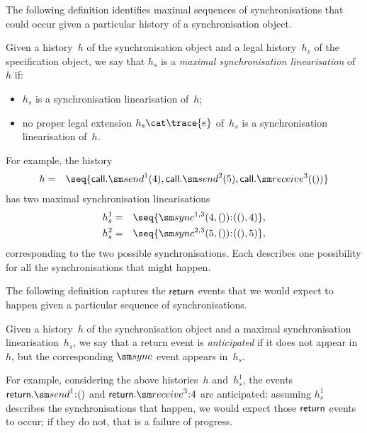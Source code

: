 
The following definition identifies maximal sequences of synchronisations
that could occur given a particular history of a synchronisation object.
%
\begin{definition}
Given a history~$h$ of the synchronisation object and a legal history~$h_s$ of
the specification object, we say that $h_s$ is a \emph{maximal synchronisation
  linearisation} of~$h$ if:
\begin{itemize}
\item $h_s$ is a synchronisation linearisation of~$h$;

\item no proper legal extension $h_s \cat \trace{e}$ of~$h_s$ is a
  synchronisation linearisation of~$h$.
\end{itemize}
\end{definition}
%
For example, the history 
\begin{eqnarray*}
h & = &\seq{\call.\send^1(4), \call.\send^2(5), \call.\receive^3(())}
\end{eqnarray*}
has two maximal synchronisation linearisations
\begin{eqnarray*}
h_s^1 & = &  \seq{\sync^{1,3}(4,())\::((),4)}, \\
h_s^2 & = & \seq{\sync^{2,3}(5,())\::((),5)},
\end{eqnarray*}
corresponding to the two possible synchronisations.  Each describes one
possibility for all the synchronisations that might happen. 


The following definition captures the $\mathsf{return}$ events that we would expect to
happen given a particular sequence of synchronisations.
%
\begin{definition}
Given a history~$h$ of the synchronisation object and a maximal
synchronisation linearisation~$h_s$, we say that a return event is
\emph{anticipated} if it does not appear in~$h$, but the corresponding $\sync$
event appears in~$h_s$.
\end{definition}
%
For example, considering the above histories~$h$ and~$h_s^1$, the events
$\return.\send^1\::()$ and $\return.\receive^3\::4$ are anticipated: assuming
$h_s^1$ describes the synchronisations that happen, we would expect those
$\mathsf{return}$ events to occur; if they do not, that is a failure of progress.  


